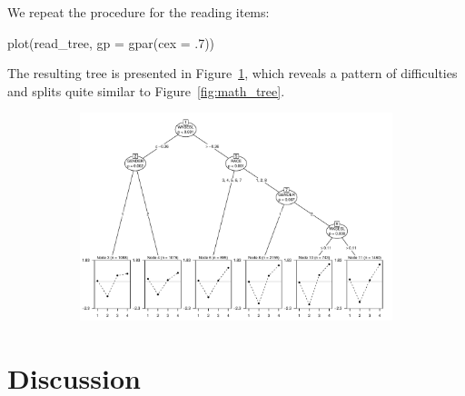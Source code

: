 \documentclass[doc,floatsintext,natbib]{apa7}
\begin{document}
We repeat the procedure for the reading items:

\begin{Schunk}
\end{Schunk}

\begin{Schunk}
\begin{Sinput}
 plot(read_tree, gp = gpar(cex = .7))
\end{Sinput}
\end{Schunk}

The resulting tree is presented in Figure~\ref{fig:read_tree}, which reveals a pattern of difficulties and splits quite similar to Figure~\ref{fig:math_tree}.

\begin{figure}%
\caption{Rasch tree for the four reading items.}
\begin{subfigure}{1.25\textwidth}
\includegraphics{MOB_paper-021}
\end{subfigure}
\label{fig:read_tree}
\end{figure}




\FloatBarrier
\section{Discussion}

\end{document}

